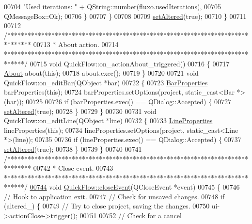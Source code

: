 \begin{DoxyCode}
00704                                \textcolor{stringliteral}{"Used iterations: "} + QString::number(fluxo.usedIterations),
00705                                QMessageBox::Ok);
00706     \}
00707   \}
00708 
00709   \hyperlink{group___window_ga4b63ea5ca52a9eea14db0a22b5a133f8}{setAltered}(\textcolor{keyword}{true});
00710 \}
00711 
00712 \textcolor{comment}{/*******************************************************************************}
00713 \textcolor{comment}{ * About action.}
00714 \textcolor{comment}{ ******************************************************************************/}
00715 \textcolor{keywordtype}{void} QuickFlow::on\_actionAbout\_triggered()
00716 \{
00717   \hyperlink{class_about}{About} about(\textcolor{keyword}{this});
00718   about.exec();
00719 \}
00720 
00721 \textcolor{keywordtype}{void} QuickFlow::on\_editBar(QObject *bar)
00722 \{
00723   \hyperlink{class_bar_properties}{BarProperties} barProperties(\textcolor{keyword}{this});
00724   barProperties.setOptions(project, static\_cast<Bar *>(bar));
00725 
00726   \textcolor{keywordflow}{if} (barProperties.exec() == QDialog::Accepted) \{
00727     \hyperlink{group___window_ga4b63ea5ca52a9eea14db0a22b5a133f8}{setAltered}(\textcolor{keyword}{true});
00728   \}
00729 \}
00730 
00731 \textcolor{keywordtype}{void} QuickFlow::on\_editLine(QObject *line)
00732 \{
00733   \hyperlink{class_line_properties}{LineProperties} lineProperties(\textcolor{keyword}{this});
00734   lineProperties.setOptions(project, static\_cast<Line *>(line));
00735 
00736   \textcolor{keywordflow}{if} (lineProperties.exec() == QDialog::Accepted) \{
00737     \hyperlink{group___window_ga4b63ea5ca52a9eea14db0a22b5a133f8}{setAltered}(\textcolor{keyword}{true});
00738   \}
00739 \}
00740 
00741 \textcolor{comment}{/*******************************************************************************}
00742 \textcolor{comment}{ * Close event.}
00743 \textcolor{comment}{ ******************************************************************************/}
\hypertarget{quickflow_8cpp_source_l00744}{}\hyperlink{group___window_gac8cc1bb329961a0781ffed7b6f2ab402}{00744} \textcolor{keywordtype}{void} \hyperlink{group___window_gac8cc1bb329961a0781ffed7b6f2ab402}{QuickFlow::closeEvent}(QCloseEvent *event)
00745 \{
00746   \textcolor{comment}{// Hook to application exit.}
00747   \textcolor{comment}{// Check for unsaved changes.}
00748   \textcolor{keywordflow}{if} (altered\_) \{
00749     \textcolor{comment}{// Try to close project, saving the changes.}
00750     ui->actionClose->trigger();
00751 
00752     \textcolor{comment}{// Check for a  cancel}

\end{DoxyCode}

